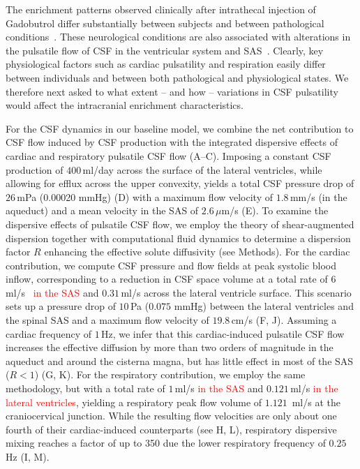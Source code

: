 \documentclass[fleqn,10pt]{wlscirep}
\newcommand{\discuss}[1]{\textcolor{red}{#1}}
\begin{document}
The enrichment patterns observed clinically after intrathecal
injection of Gadobutrol differ substantially between subjects and
between pathological conditions~\cite{ringstad2018brain,
  eide2021direction, eide2021impaired, eide2022altered}. These
neurological conditions are also associated with alterations in the
pulsatile flow of CSF in the ventricular system and
SAS~\cite{eide2021direction}. Clearly, key physiological factors such
as cardiac pulsatility and respiration easily differ between
individuals and between both pathological and physiological states. We
therefore next asked to what extent -- and how -- variations in CSF
pulsatility would affect the intracranial enrichment characteristics.

For the CSF dynamics in our baseline model, we combine the net
contribution to CSF flow induced by CSF production with the integrated
dispersive effects of cardiac and respiratory pulsatile CSF flow
(A--C). Imposing a constant CSF production of
$400\,$ml/day across the surface of the lateral ventricles, while
allowing for efflux across the upper convexity, yields a total CSF
pressure drop of $26\,$mPa (0.00020 mmHg) (D) with a
maximum flow velocity of $1.8\,$mm/s (in the aqueduct) and a mean
velocity in the SAS of $2.6\,\mu$m/s (E). To examine the
dispersive effects of pulsatile CSF flow, we employ the theory of
shear-augmented dispersion together with computational fluid dynamics
to determine a dispersion factor $R$ enhancing the effective solute
diffusivity (see Methods). For the cardiac contribution, we compute
CSF pressure and flow fields at peak systolic blood inflow,
corresponding to a reduction in CSF space volume at a total rate of
$6\,$ml/s~\cite{baledent2014imaging, causemann2022human} \discuss{in
  the SAS} and $0.31\,$ml/s across the lateral ventricle
surface\cite{vinje2019respiratory}. This scenario sets up a pressure
drop of $10\,$Pa ($0.075$ mmHg) between the lateral ventricles and the
spinal SAS and a maximum flow velocity of $19.8\,$cm/s
(F, J). Assuming a cardiac frequency of $1\,$Hz, we
infer that this cardiac-induced pulsatile CSF flow increases the
effective diffusion by more than two orders of magnitude in the
aqueduct and around the cisterna magna, but has little effect in most
of the SAS ($R < 1$) (G, K). For the respiratory
contribution, we employ the same methodology, but with a total rate of
$1\,$ml/s \cite{gutierrez2022effect} \discuss{in the SAS} and
$0.121\,$ml/s \cite{liu2024using} \discuss{in the lateral
  ventricles}, yielding a respiratory peak flow volume of $1.121\,$
ml/s at the craniocervical junction. While
the resulting flow velocities are only about one fourth of their
cardiac-induced counterparts (see H, L), respiratory
dispersive mixing reaches a factor of up to 350 due the lower
respiratory frequency of $0.25\,$Hz (I, M).
\end{document}
